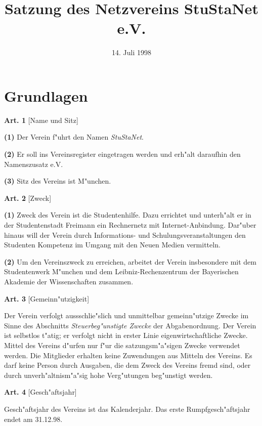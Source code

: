 \documentclass[12pt]{article}
\title{\bf Satzung des Netzvereins StuStaNet e.V.}
\date{14. Juli 1998}
\newcommand{\Abschnitt}[1]{\section{#1}}
\newcommand{\Satz}[2]{

\begin{samepage}
{\bf (#1)} #2
\end{samepage}
}
\newenvironment{Artikel}[2]{
\bigskip \centerline{{\bf Art. #1} [#2]}
\nopagebreak
}{
}
\begin{document}
\maketitle

\Abschnitt{Grundlagen}

\begin{Artikel}{1}{Name und Sitz}

\Satz{1}{Der Verein f"uhrt den Namen {\it StuStaNet}.}

\Satz{2}{Er soll ins Vereinsregister eingetragen werden und erh"alt
daraufhin den Namenszusatz e.V.}

\Satz{3}{Sitz des Vereins ist M"unchen.}

\end{Artikel}

\begin{Artikel}{2}{Zweck}

\Satz{1}{Zweck des Verein ist die Studentenhilfe. Dazu errichtet und 
unterh"alt er in der Studentenstadt Freimann ein Rechnernetz mit 
Internet-Anbindung. Dar"uber hinaus will der Verein durch 
Informations- und Schulungsveranstaltungen den Studenten Kompetenz 
im Umgang mit den Neuen Medien vermitteln.}

\Satz{2}{Um den Vereinszweck zu erreichen, arbeitet der Verein insbesondere
mit dem Studentenwerk M"unchen und dem Leibniz-Rechenzentrum der Bayerischen 
Akademie der Wissenschaften zusammen.}

\end{Artikel}

\begin{Artikel}{3}{Gemeinn"utzigkeit}

Der Verein verfolgt aussschlie"slich und unmittelbar gemeinn"utzige Zwecke 
im Sinne des Abschnitts {\it Steuerbeg"unstigte Zwecke} der Abgabenordnung.
Der Verein ist selbstlos t"atig; er verfolgt nicht in erster Linie 
eigenwirtschaftliche Zwecke. Mittel des Vereins d"urfen nur f"ur die 
satzungsm"a"sigen Zwecke verwendet werden. Die Mitglieder erhalten keine 
Zuwendungen aus Mitteln des Vereins. Es darf keine Person durch Ausgaben,
die dem Zweck des Vereins fremd sind, oder durch unverh"altnism"a"sig hohe 
Verg"utungen beg"unstigt werden. 

\end{Artikel}


\begin{Artikel}{4}{Gesch"aftsjahr}

Gesch"aftsjahr des Vereins ist das Kalenderjahr. Das erste Rumpfgesch"aftsjahr
endet am 31.12.98.

\end{Artikel}
\end{document}
